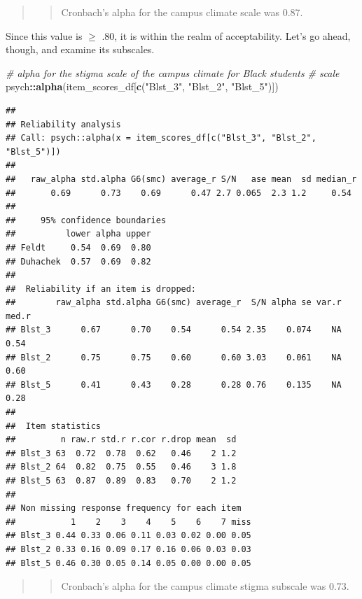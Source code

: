 \documentclass[
  11pt,
]{book}
\newenvironment{Shaded}{\begin{snugshade}}{\end{snugshade}}
\newcommand{\CommentTok}[1]{\textcolor[rgb]{0.37,0.37,0.37}{\textit{#1}}}
\newcommand{\FunctionTok}[1]{\textcolor[rgb]{0.27,0.27,0.27}{\textbf{#1}}}
\newcommand{\NormalTok}[1]{#1}
\newcommand{\SpecialCharTok}[1]{\textcolor[rgb]{0.43,0.43,0.43}{\textbf{#1}}}
\newcommand{\StringTok}[1]{\textcolor[rgb]{0.5,0.5,0.5}{#1}}
\begin{document}
\begin{quote}
\begin{quote}
Cronbach's alpha for the campus climate scale was 0.87.
\end{quote}
\end{quote}

Since this value is \(\geq\) .80, it is within the realm of acceptability. Let's go ahead, though, and examine its subscales.

\begin{Shaded}
\begin{Highlighting}[]
\CommentTok{\# alpha for the stigma scale of the campus climate for Black students}
\CommentTok{\# scale}
\NormalTok{psych}\SpecialCharTok{::}\FunctionTok{alpha}\NormalTok{(item\_scores\_df[}\FunctionTok{c}\NormalTok{(}\StringTok{"Blst\_3"}\NormalTok{, }\StringTok{"Blst\_2"}\NormalTok{, }\StringTok{"Blst\_5"}\NormalTok{)])}
\end{Highlighting}
\end{Shaded}

\begin{verbatim}
## 
## Reliability analysis   
## Call: psych::alpha(x = item_scores_df[c("Blst_3", "Blst_2", "Blst_5")])
## 
##   raw_alpha std.alpha G6(smc) average_r S/N   ase mean  sd median_r
##       0.69      0.73    0.69      0.47 2.7 0.065  2.3 1.2     0.54
## 
##     95% confidence boundaries 
##          lower alpha upper
## Feldt     0.54  0.69  0.80
## Duhachek  0.57  0.69  0.82
## 
##  Reliability if an item is dropped:
##        raw_alpha std.alpha G6(smc) average_r  S/N alpha se var.r med.r
## Blst_3      0.67      0.70    0.54      0.54 2.35    0.074    NA  0.54
## Blst_2      0.75      0.75    0.60      0.60 3.03    0.061    NA  0.60
## Blst_5      0.41      0.43    0.28      0.28 0.76    0.135    NA  0.28
## 
##  Item statistics 
##         n raw.r std.r r.cor r.drop mean  sd
## Blst_3 63  0.72  0.78  0.62   0.46    2 1.2
## Blst_2 64  0.82  0.75  0.55   0.46    3 1.8
## Blst_5 63  0.87  0.89  0.83   0.70    2 1.2
## 
## Non missing response frequency for each item
##           1    2    3    4    5    6    7 miss
## Blst_3 0.44 0.33 0.06 0.11 0.03 0.02 0.00 0.05
## Blst_2 0.33 0.16 0.09 0.17 0.16 0.06 0.03 0.03
## Blst_5 0.46 0.30 0.05 0.14 0.05 0.00 0.00 0.05
\end{verbatim}

\begin{quote}
\begin{quote}
Cronbach's alpha for the campus climate stigma subscale was 0.73.
\end{quote}
\end{quote}
\end{document}
